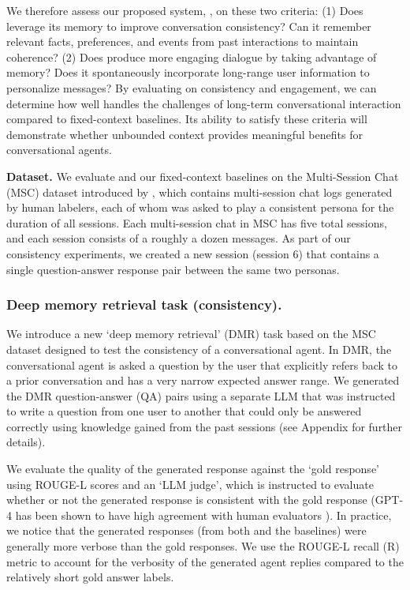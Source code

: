 We therefore assess our proposed system, \ours, on these two criteria:
(1) Does \ours leverage its memory to improve conversation consistency? Can it remember relevant facts, preferences, and events from past interactions to maintain coherence?
(2) Does \ours produce more engaging dialogue by taking advantage of memory? Does it spontaneously incorporate long-range user information to personalize messages?
By evaluating on consistency and engagement, we can determine how well \ours handles the challenges of long-term conversational interaction compared to fixed-context baselines. Its ability to satisfy these criteria will demonstrate whether unbounded context provides meaningful benefits for conversational agents.




\textbf{Dataset.}
We evaluate \ours and our fixed-context baselines on the Multi-Session Chat (MSC) dataset introduced by \citet{xu2021mscbeyond}, which contains multi-session chat logs generated by human labelers, each of whom was asked to play a consistent persona for the duration of all sessions. Each multi-session chat in MSC has five total sessions, and each session consists of a roughly a dozen messages.
As part of our consistency experiments, we created a new session (session 6) that contains a single question-answer response pair between the same two personas. 



\subsubsection{Deep memory retrieval task (consistency).}
We introduce a new `deep memory retrieval' (DMR) task based on the MSC dataset designed to test the consistency of a conversational agent. In DMR, the conversational agent is asked a question by the user that explicitly refers back to a prior conversation and has a very narrow expected answer range. We generated the DMR question-answer (QA) pairs using a separate LLM that was instructed to write a question from one user to another that could only be answered correctly using knowledge gained from the past sessions (see Appendix for further details).

We evaluate the quality of the generated response against the `gold response' using ROUGE-L scores \citep{lin2004rouge} and an `LLM judge', which is instructed to evaluate whether or not the generated response is consistent with the gold response (GPT-4 has been shown to have high agreement with human evaluators \citep{zheng2023llmasajudge}).
In practice, we notice that the generated responses (from both \ours and the baselines) were generally more verbose than the gold responses.
We use the ROUGE-L recall (R) metric to account for the verbosity of the generated agent replies compared to the relatively short gold answer labels.


